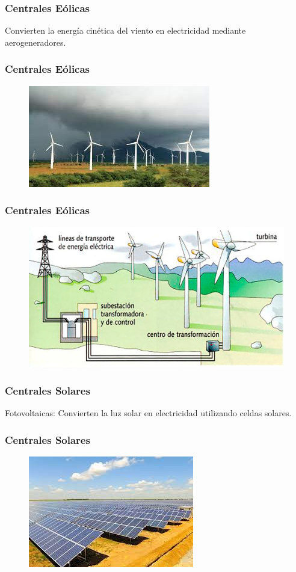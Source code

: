 \documentclass[14pt]{beamer}
\begin{document}
\begin{frame}
\frametitle{Centrales Eólicas}
Convierten la energía cinética del viento en electricidad mediante aerogeneradores.
\end{frame}
\begin{frame}
\frametitle{Centrales Eólicas}
\vspace*{-1cm}
\begin{figure}
    \centering
    \includegraphics[scale=1]{Imagenes/Planta_Eolica_01.jpeg}
\end{figure}
\end{frame}
\begin{frame}
\frametitle{Centrales Eólicas}
\vspace*{-1cm}
\begin{figure}
    \centering
    \includegraphics[scale=0.3]{Imagenes/Planta_Eolica_02.jpeg}
\end{figure}
\end{frame}
\begin{frame}
\frametitle{Centrales Solares}
Fotovoltaicas: Convierten la luz solar en electricidad utilizando celdas solares.
\end{frame}
\begin{frame}
\frametitle{Centrales Solares}
\vspace*{-1cm}
\begin{figure}
    \centering
    \includegraphics[scale=0.75]{Imagenes/Planta_Solar_01.jpeg}
\end{figure}
\end{frame}
\end{document}
